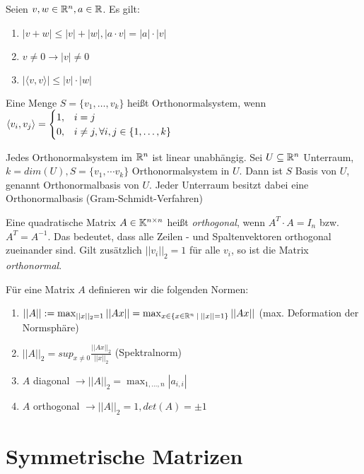 \begin{satz}
	Seien $v, w \in \mathbb{R}^n, a \in \mathbb{R}$. Es gilt:
	
	\begin{enumerate}[noitemsep]
		\item $|v + w| \leq |v| + |w|, |a \cdot v| = |a| \cdot |v|$
		\item $v \neq 0 \rightarrow |v| \neq 0$
		\item $|\langle v, v \rangle| \leq |v| \cdot |w| $ 
	\end{enumerate}
\end{satz}

\begin{definition}[Orthonormalsystem]
	Eine Menge $S = \{ v_1, \dots, v_k \} $ heißt Orthonormalsystem, wenn $\langle v_i, v_j \rangle = \begin{cases}
		1, & i = j \\
		0, & i \neq j, \forall i,j \in \{1, \dots, k\}
	\end{cases}$
\end{definition}

\begin{satz}
	Jedes Orthonormalsystem im $\mathbb{R}^n$ ist linear unabhängig. 
	Sei $U \subseteq \mathbb{R}^n$ Unterraum, $k = dim(U), S = \{v_1,\dotsm v_k\}$ Orthonormalsystem in $U$. Dann ist $S$ Basis von $U$, genannt Orthonormalbasis von $U$. Jeder Unterraum besitzt dabei eine Orthonormalbasis (Gram-Schmidt-Verfahren)
\end{satz}

\begin{definition}
	Eine quadratische Matrix $A \in \mathbb{K}^{n \times n}$ heißt \emph{orthogonal}, wenn $A^T \cdot A = I_n$ bzw. $A^T = A^{-1}$. Das bedeutet, dass alle Zeilen - und Spaltenvektoren orthogonal zueinander sind. Gilt zusätzlich $||v_i||_2 = 1$ für alle $v_i$, so ist die Matrix \emph{orthonormal}.
\end{definition}

\begin{definition}[Matrixnorm]
	Für eine Matrix $A$ definieren wir die folgenden Normen:
	\begin{enumerate}[noitemsep]
		\item $||A|| := \max_{||x||_2 = 1} ||Ax|| = \max_{x \in \{x \in \mathbb{R}^n \medspace | \medspace ||x|| = 1\}} ||Ax||$ (max. Deformation der Normsphäre)
		\item $||A||_2 = sup_{x \neq 0} \frac{||Ax||_2}{||x||_2}$ (Spektralnorm)
		\item $A$ diagonal $\rightarrow ||A||_2 = \max_{1,\dots, n} |a_{i,i}|$ 
		\item $A$ orthogonal $\rightarrow ||A||_2 = 1, det(A) = \pm 1$
	\end{enumerate}
\end{definition}

\section{Symmetrische Matrizen}
